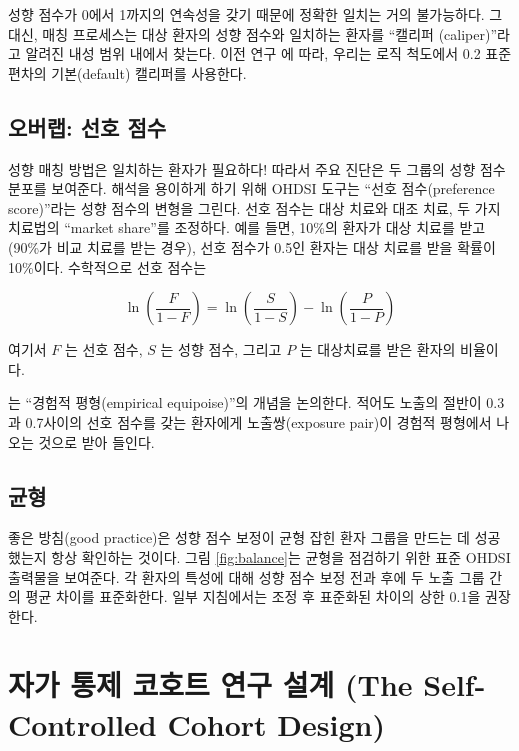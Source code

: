 \documentclass[11pt]{book}
\theoremstyle{definition}
\theoremstyle{definition}
\theoremstyle{definition}
\theoremstyle{remark}
\begin{document}

성향 점수가 0에서 1까지의 연속성을 갖기 때문에 정확한 일치는 거의
불가능하다. 그 대신, 매칭 프로세스는 대상 환자의 성향 점수와 일치하는
환자를 ``캘리퍼 (caliper)''라고 알려진 내성 범위 내에서 찾는다. 이전
연구 \citep{austin_2011}에 따라, 우리는 로직 척도에서 0.2 표준편차의
기본(default) 캘리퍼를 사용한다.

\subsection{오버랩: 선호 점수}\label{--}


성향 매칭 방법은 일치하는 환자가 필요하다! 따라서 주요 진단은 두 그룹의
성향 점수 분포를 보여준다. 해석을 용이하게 하기 위해 OHDSI 도구는 ``선호
점수(preference score)''라는 성향 점수의 변형을 그린다.
\citep{walker_2013} 선호 점수는 대상 치료와 대조 치료, 두 가지 치료법의
``market share''를 조정하다. 예를 들면, 10\%의 환자가 대상 치료를 받고
(90\%가 비교 치료를 받는 경우), 선호 점수가 0.5인 환자는 대상 치료를
받을 확률이 10\%이다. 수학적으로 선호 점수는

\[\ln\left(\frac{F}{1-F}\right)=\ln\left(\frac{S}{1-S}\right)-\ln\left(\frac{P}{1-P}\right)\]

여기서 \(F\) 는 선호 점수, \(S\) 는 성향 점수, 그리고 \(P\) 는
대상치료를 받은 환자의 비율이다.

\citet{walker_2013} 는 ``경험적 평형(empirical equipoise)''의 개념을
논의한다. 적어도 노출의 절반이 0.3과 0.7사이의 선호 점수를 갖는 환자에게
노출쌍(exposure pair)이 경험적 평형에서 나오는 것으로 받아 들인다.

\subsection{균형}

 

좋은 방침(good practice)은 성향 점수 보정이 균형 잡힌 환자 그룹을 만드는
데 성공했는지 항상 확인하는 것이다. 그림 \ref{fig:balance}는 균형을
점검하기 위한 표준 OHDSI 출력물을 보여준다. 각 환자의 특성에 대해 성향
점수 보정 전과 후에 두 노출 그룹 간의 평균 차이를 표준화한다. 일부
지침에서는 조정 후 표준화된 차이의 상한 0.1을 권장한다.
\citep{rubin_2001}

\section{자가 통제 코호트 연구 설계 (The Self-Controlled Cohort
Design)}\label{-----the-self-controlled-cohort-design}
\end{document}
